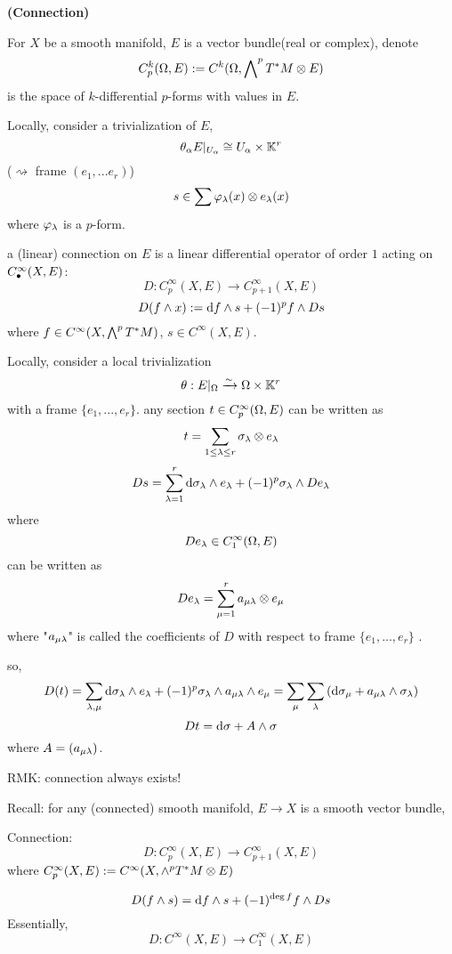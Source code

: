 \textbf{(Connection)}

\begin{notation}

For $X$ be a smooth manifold, $E$ is a vector bundle(real or complex), denote
$$C_p^k(\Omega,E):=C^k(\Omega,\bigwedge\nolimits^{p}T^*M\otimes E)$$
is the space of $k$-differential $p$-forms with values in $E$.

Locally, consider a trivialization of $E$,
$$\theta_{\alpha}E|_{U_{\alpha}}\cong U_{\alpha}\times \mathbb{K}^{r}$$
($\rightsquigarrow$ frame $(e_1,...e_r)$)
$$s\in \sum\varphi_{\lambda}(x)\otimes e_{\lambda}(x)$$
where $\varphi_{\lambda}$ is a $p$-form.
\end{notation}

\begin{definition}
a (linear) connection on $E$ is a linear differential operator of order $1$ acting on
$C^{\infty}_{\bullet}(X,E)$:
$$D:C_{p}^{\infty}(X,E)\to C_{p+1}^{\infty}(X,E)$$
$$D(f\wedge x):= \mathrm{d} f\wedge s+(-1)^p f\wedge Ds$$
where $f\in C^{\infty}(X,\bigwedge\nolimits^{p}T^*M)$, $s\in C^{\infty}(X,E)$.
\end{definition}

Locally, consider a local trivialization
$$\theta:E|_{\Omega}\xrightarrow{\sim}\Omega\times\mathbb{K}^r$$
with a frame $\{e_1,...,e_r\}$. any section
$t\in C^{\infty}_p(\Omega,E)$ can be written as
$$t=\sum_{1\leq\lambda\leq r}\sigma_{\lambda}\otimes e_{\lambda}$$
$$Ds=\sum_{\lambda=1}^r\mathrm{d}\sigma_{\lambda}\wedge e_{\lambda}+(-1)^p\sigma_{\lambda}\wedge De_{\lambda}$$
where
$$De_{\lambda}\in C_1^{\infty}(\Omega, E)$$
can be written as
$$De_{\lambda}=\sum_{\mu=1}^r
             a_{\mu\lambda}\otimes e_{\mu}$$
where "$a_{\mu \lambda}$" is called the coefficients of $D$
 with respect to frame $\{e_1,...,e_r\}$ .

so,
$$D(t)=
\sum_{\lambda,\mu}
  \mathrm{d}\sigma_{\lambda}\wedge e_{\lambda}+(-1)^p\sigma_{\lambda}\wedge a_{\mu\lambda}\wedge e_{\mu}
=\sum_{\mu}
   \sum_{\lambda}
     \left(
       \mathrm{d}\sigma_{\mu}+
       a_{\mu\lambda}\wedge\sigma_{\lambda}
     \right)$$
$$Dt=\mathrm{d}\sigma+A\wedge\sigma$$
where $A=(a_{\mu\lambda})$.

RMK: connection always exists!


Recall: for any (connected) smooth manifold, 
$E\to X$ is a smooth vector bundle, 

Connection: 
$$D:C^\infty_p(X,E)\to C_{p+1}^\infty(X,E)$$
where $C^\infty_p(X,E):=C^\infty(X,\wedge^pT^*M\otimes E)$

$$D(f\wedge s)=\mathrm{d} f\wedge s+(-1)^{\deg f}f\wedge Ds$$
Essentially, 
$$D:C^\infty(X,E)\to C_1^\infty(X,E)$$

